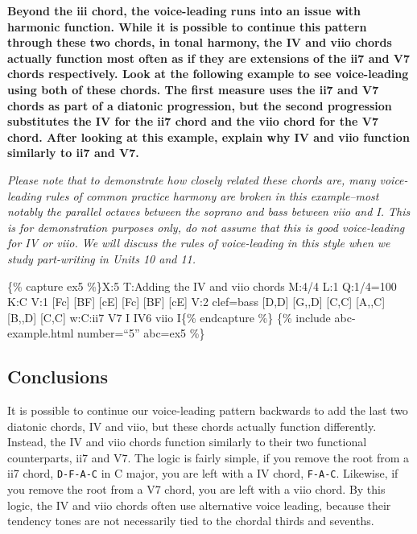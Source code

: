 \documentclass{book}
\begin{document}
\textbf{Beyond the iii chord, the voice-leading runs into an issue with
harmonic function. While it is possible to continue this pattern through these
two chords, in tonal harmony, the IV and viio chords actually function most
often as if they are extensions of the ii7 and V7 chords respectively. Look at
the following example to see voice-leading using both of these chords. The
first measure uses the ii7 and V7 chords as part of a diatonic progression,
but the second progression substitutes the IV for the ii7 chord and the viio
chord for the V7 chord. After looking at this example, explain why IV and viio
function similarly to ii7 and V7.}

\emph{Please note that to demonstrate how closely related these chords are,
many voice-leading rules of common practice harmony are broken in this
example--most notably the parallel octaves between the soprano and bass
between viio and I. This is for demonstration purposes only, do not assume
that this is good voice-leading for IV or viio. We will discuss the rules of
voice-leading in this style when we study part-writing in Units 10 and 11.}

\{\% capture ex5 \%\}X:5 T:Adding the IV and viio chords M:4/4 L:1 Q:1/4=100
K:C V:1 {[}Fc{]}\textbar{} {[}BF{]}\textbar{} {[}cE{]}\textbar\textbar{}
{[}Fc{]}\textbar{} {[}BF{]}\textbar{} {[}cE{]}\textbar{]} V:2 clef=bass
{[}D,D{]}\textbar{} {[}G,,D{]}\textbar{} {[}C,C{]}\textbar\textbar{}
{[}A,,C{]}\textbar{} {[}B,,D{]}\textbar{} {[}C,C{]}\textbar{]} w:C:ii7 V7 I
IV6 viio I\{\% endcapture \%\} \{\% include abc-example.html number=``5''
abc=ex5 \%\}

\hypertarget{conclusions-3}{%
\subsection{Conclusions}\label{conclusions-3}}

It is possible to continue our voice-leading pattern backwards to add the last
two diatonic chords, IV and viio, but these chords actually function
differently. Instead, the IV and viio chords function similarly to their two
functional counterparts, ii7 and V7. The logic is fairly simple, if you remove
the root from a ii7 chord, \texttt{D-F-A-C} in C major, you are left with a IV
chord, \texttt{F-A-C}. Likewise, if you remove the root from a V7 chord, you
are left with a viio chord. By this logic, the IV and viio chords often use
alternative voice leading, because their tendency tones are not necessarily
tied to the chordal thirds and sevenths.
\end{document}
